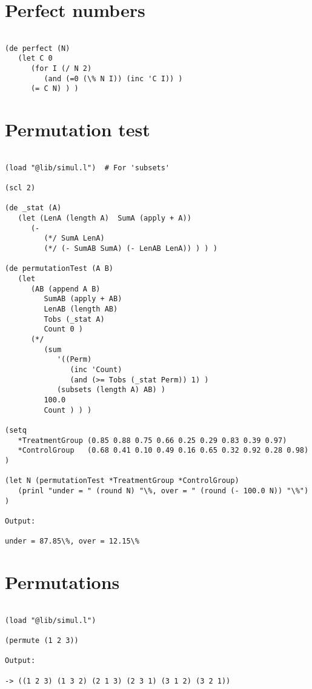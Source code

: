 \section*{Perfect numbers}

\begin{verbatim}

(de perfect (N)
   (let C 0
      (for I (/ N 2)
         (and (=0 (\% N I)) (inc 'C I)) )
      (= C N) ) )

\end{verbatim}

\section*{Permutation test}

\begin{verbatim}

(load "@lib/simul.l")  # For 'subsets'

(scl 2)

(de _stat (A)
   (let (LenA (length A)  SumA (apply + A))
      (-
         (*/ SumA LenA)
         (*/ (- SumAB SumA) (- LenAB LenA)) ) ) )

(de permutationTest (A B)
   (let
      (AB (append A B)
         SumAB (apply + AB)
         LenAB (length AB)
         Tobs (_stat A)
         Count 0 )
      (*/
         (sum
            '((Perm)
               (inc 'Count)
               (and (>= Tobs (_stat Perm)) 1) )
            (subsets (length A) AB) )
         100.0
         Count ) ) )

(setq
   *TreatmentGroup (0.85 0.88 0.75 0.66 0.25 0.29 0.83 0.39 0.97)
   *ControlGroup   (0.68 0.41 0.10 0.49 0.16 0.65 0.32 0.92 0.28 0.98) )

(let N (permutationTest *TreatmentGroup *ControlGroup)
   (prinl "under = " (round N) "\%, over = " (round (- 100.0 N)) "\%") )

Output:

under = 87.85\%, over = 12.15\%

\end{verbatim}

\section*{Permutations}

\begin{verbatim}

(load "@lib/simul.l")

(permute (1 2 3))

Output:

-> ((1 2 3) (1 3 2) (2 1 3) (2 3 1) (3 1 2) (3 2 1))

\end{verbatim}

